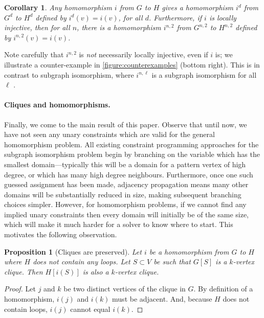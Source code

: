 \documentclass{article}
\newtheorem{proposition}{Proposition}
\newtheorem{corollary}{Corollary}
\begin{document}
\begin{corollary}Any homomorphism $i$ from $G$ to $H$ gives a homomorphism $i^d$ from $G^d$ to $H^d$
    defined by $i^d(v) = i(v)$, for all $d$. Furthermore, if $i$ is locally injective, then for all
    $n$, there is a homomorphism $i^{n,2}$ from $G^{n,2}$ to
    $H^{n,2}$ defined by $i^{n,2}(v) = i(v)$.
\end{corollary}

Note carefully that $i^{n,2}$ is \emph{not} necessarily locally injective, even if $i$ is; we
illustrate a counter-example in \cref{figure:counterexamples} (bottom right). This is in contrast to
subgraph isomorphism, where $i^{n,\ell}$ is a subgraph isomorphism for all $\ell$
\cite{DBLP:conf/cp/McCreeshP15}.

\paragraph{Cliques and homomorphisms.} Finally, we come to the main result of this paper. Observe
that until now, we have not seen any unary constraints which are valid for the general homomorphism
problem. All existing constraint programming approaches for the subgraph isomorphism problem begin
by branching on the variable which has the smallest domain---typically this will be a domain for a
pattern vertex of high degree, or which has many high degree neighbours. Furthermore, once one such
guessed assignment has been made, adjacency propagation means many other domains will be
substantially reduced in size, making subsequent branching choices simpler.  However, for
homomorphism problems, if we cannot find any implied unary constraints then every domain will
initially be of the same size, which will make it much harder for a solver to know where to start.
This motivates the following observation.

\begin{proposition}[Cliques are preserved]\label{proposition:clique}
    Let $i$ be a homomorphism from $G$ to $H$ where $H$ does
    not contain any loops. Let $S\subset V$ be such that $G[S]$ is a $k$-vertex clique. Then
    $H[i(S)]$ is also a $k$-vertex clique.
\end{proposition}

\begin{proof}
    Let $j$ and $k$ be two distinct vertices of the clique in $G$. By definition of a homomorphism,
    $i(j)$ and $i(k)$ must be adjacent. And, because $H$ does not contain loops, $i(j)$ cannot equal
    $i(k)$.
\end{proof}
\end{document}
